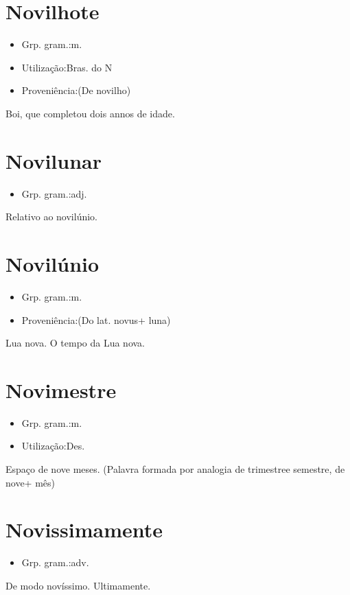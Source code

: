 \section{Novilhote}
\begin{itemize}
\item {Grp. gram.:m.}
\end{itemize}
\begin{itemize}
\item {Utilização:Bras. do N}
\end{itemize}
\begin{itemize}
\item {Proveniência:(De \textunderscore novilho\textunderscore )}
\end{itemize}
Boi, que completou dois annos de idade.
\section{Novilunar}
\begin{itemize}
\item {Grp. gram.:adj.}
\end{itemize}
Relativo ao novilúnio.
\section{Novilúnio}
\begin{itemize}
\item {Grp. gram.:m.}
\end{itemize}
\begin{itemize}
\item {Proveniência:(Do lat. \textunderscore novus\textunderscore  + \textunderscore luna\textunderscore )}
\end{itemize}
Lua nova.
O tempo da Lua nova.
\section{Novimestre}
\begin{itemize}
\item {Grp. gram.:m.}
\end{itemize}
\begin{itemize}
\item {Utilização:Des.}
\end{itemize}
Espaço de nove meses.
(Palavra formada por analogia de \textunderscore trimestre\textunderscore  e \textunderscore semestre\textunderscore , de \textunderscore nove\textunderscore  + \textunderscore mês\textunderscore )
\section{Novissimamente}
\begin{itemize}
\item {Grp. gram.:adv.}
\end{itemize}
De modo novíssimo.
Ultimamente.
